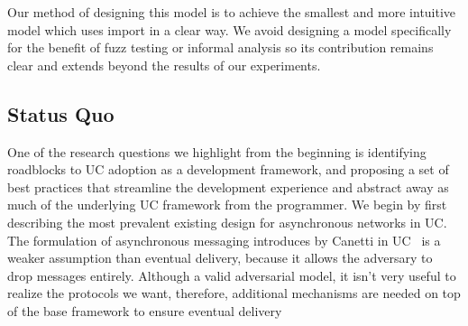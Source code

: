 Our method of designing this model is to achieve the smallest and more intuitive model which uses import in a clear way.
We avoid designing a model specifically for the benefit of fuzz testing or informal analysis so its contribution remains clear and extends beyond the results of our experiments.

%

\subsection{Status Quo}
One of the research questions we highlight from the beginning is identifying roadblocks to UC adoption as a development framework, and proposing a set of best practices that streamline the development experience and abstract away as much of the underlying UC framework from the programmer.
We begin by first describing the most prevalent existing design for asynchronous networks in UC.
The formulation of asynchronous messaging introduces by Canetti in UC~\cite{uc} is a weaker assumption than eventual delivery, because it allows the adversary to drop messages entirely.
Although a valid adversarial model, it isn't very useful to realize the protocols we want, therefore, additional mechanisms are needed on top of the base framework to ensure eventual delivery

